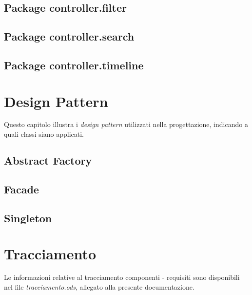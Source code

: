 \documentclass[10pt,a4paper,headinclude,footinclude,hidelinks]{scrreprt} %
\begin{document}
	\section{Package controller.filter}
	\label{ch:stage:design:sistema:controller.filter}

	\section{Package controller.search}
	\label{ch:stage:design:sistema:controller.search}

	\section{Package controller.timeline}
	\label{ch:stage:design:sistema:controller.timeline}

	\chapter{Design Pattern}
	\label{ch:stage:design:pattern}
	Questo capitolo illustra i \textit{design pattern} utilizzati nella progettazione, indicando a quali classi siano applicati.

	\section{Abstract Factory}
	\label{ch:stage:design:pattern:factory}

	\section{Facade}
	\label{ch:stage:design:pattern:facade}

	\section{Singleton}
	\label{ch:stage:design:pattern:singleton}

	\chapter{Tracciamento}
	\label{ch:stage:design:tracciamento}
	Le informazioni relative al tracciamento componenti - requisiti sono disponibili nel file \textit{tracciamento.ods}, allegato alla presente documentazione.
\end{document}
